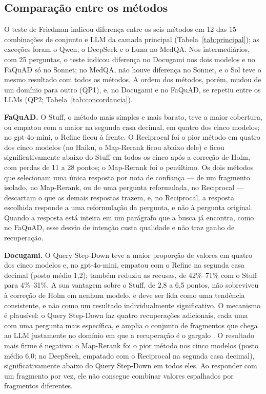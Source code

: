 \subsection{Comparação entre os métodos}
\label{ssc:metodos}

O teste de Friedman indicou diferença entre os seis métodos em 12 das 15 combinações de conjunto e LLM da camada principal (Tabela~\ref{tab:principal}); as exceções foram o Qwen, o DeepSeek e o Luna no MedQA. Nos intermediários, com 25 perguntas, o teste indicou diferença no Docugami nos dois modelos e no FaQuAD só no Sonnet; no MedQA, não houve diferença no Sonnet, e o Sol teve o mesmo resultado com todos os métodos. A ordem dos métodos, porém, mudou de um domínio para outro (QP1), e, no Docugami e no FaQuAD, se repetiu entre os LLMs (QP2; Tabela~\ref{tab:concordancia}).


\textbf{FaQuAD.} O Stuff, o método mais simples e mais barato, teve a maior cobertura, ou empatou com a maior na segunda casa decimal, em quatro dos cinco modelos; no gpt-4o-mini, o Refine ficou à frente. O Reciprocal foi o pior método em quatro dos cinco modelos (no Haiku, o Map-Rerank ficou abaixo dele) e ficou significativamente abaixo do Stuff em todos os cinco após a correção de Holm, com perdas de 11 a 28 pontos; o Map-Rerank foi o penúltimo. Os dois métodos que selecionam uma única resposta por nota de confiança --- de um fragmento isolado, no Map-Rerank, ou de uma pergunta reformulada, no Reciprocal --- descartam o que as demais respostas trazem, e, no Reciprocal, a resposta escolhida responde a uma reformulação da pergunta, e não à pergunta original. Quando a resposta está inteira em um parágrafo que a busca já encontra, como no FaQuAD, esse desvio de intenção custa qualidade e não traz ganho de recuperação.

\textbf{Docugami.} O Query Step-Down teve a maior proporção de valores em quatro dos cinco modelos e, no gpt-4o-mini, empatou com o Refine na segunda casa decimal (posto médio 1,2); também reduziu as recusas, de 42\%--71\% com o Stuff para 4\%--31\%. A sua vantagem sobre o Stuff, de 2,8 a 6,5 pontos, não sobreviveu à correção de Holm em nenhum modelo, e deve ser lida como uma tendência consistente, e não como um resultado individualmente significativo. O mecanismo é plausível: o Query Step-Down faz quatro recuperações adicionais, cada uma com uma pergunta mais específica, e amplia o conjunto de fragmentos que chega ao LLM justamente no domínio em que a recuperação é o gargalo \cite{ma2023query}. O resultado mais firme é negativo: o Map-Rerank foi o pior método nos cinco modelos (posto médio 6,0; no DeepSeek, empatado com o Reciprocal na segunda casa decimal), significativamente abaixo do Query Step-Down em todos eles. Ao responder com um fragmento por vez, ele não consegue combinar valores espalhados por fragmentos diferentes.


